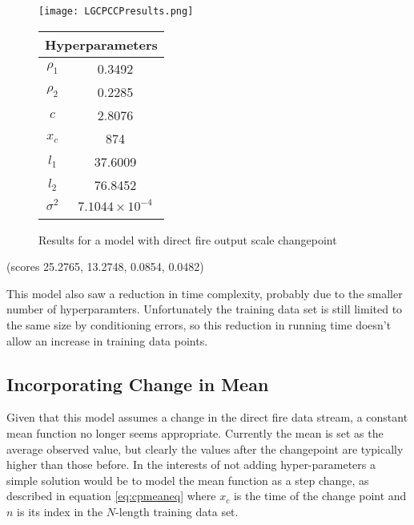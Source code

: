 \documentclass[a4paper,11pt]{report}
\begin{document}

  \begin{figure}[!ht]
    \centering
    \texttt{[image: LGCPCCPresults.png]}
    \qquad
    \doublespacing
    \begin{tabular}[b]{cc}
    \multicolumn{2}{c}{\textbf{Hyperparameters}}                                            \\ \hline
      \(\rho_1\)                    & 0.3492                \\                       
\(\rho_2\)                     & 0.2285                           \\            
\(c\)                               & 2.8076                                      \\ 
\(x_c\)                        & 874                                         \\ 
\(l_1\)                               & 37.6009                                      \\  
\(l_2\) & 76.8452 \\ 
\(\sigma^2\) & \(7.1044 \times 10^{-4}\) \\ 
& \\
    \end{tabular}
    \captionsetup{labelformat=andtable}
    \caption{Results for a model with direct fire output scale changepoint}
  \end{figure}
(scores 25.2765, 13.2748, 0.0854, 0.0482)

This model also saw a reduction in time complexity, probably due to the smaller number of hyperparamters. Unfortunately the training data set is still limited to the same size by conditioning errors, so this reduction in running time doesn't allow an increase in training data points.

\subsection{Incorporating Change in Mean}

Given that this model assumes a change in the direct fire data stream, a constant mean function no longer seems appropriate. Currently the mean is set as the average observed value, but clearly the values after the changepoint are typically higher than those before. In the interests of not adding hyper-parameters a simple solution would be to model the mean function as a step change, as described in equation \ref{eq:cpmeaneq} where \(x_c\) is the time of the change point and \(n\) is its index in the \(N\)-length training data set.
\end{document}
